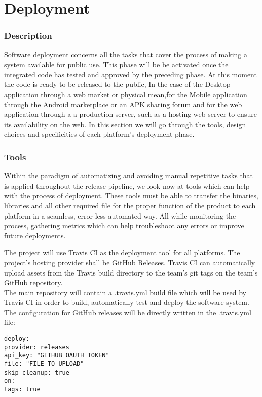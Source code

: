 \documentclass[12pt]{report}
\begin{document}
\part{Deployment}
\section{Description}
Software deployment concerns all the tasks that cover the process of making a system available for public use.
This phase will be be activated once the integrated code has tested and approved by the preceding
phase. At this moment the code is ready to be released to the public, In the case of the Desktop
application through a web market or physical mean,for the Mobile application through the Android
marketplace or an APK sharing forum and for the web application through a a production server, such
as a hosting web server to ensure its availability on the web. In this section we will go through
the tools, design choices and specificities of each platform's deployment phase.

\section{Tools}
Within the paradigm of automatizing and avoiding manual repetitive tasks that is applied throughout the release pipeline, we look now at tools which can help with the process of deployment. These tools must be able to transfer the binaries, libraries and all other required file for the proper function of the product to each platform in a seamless, error-less automated way. All while monitoring the process, gathering metrics which can help troubleshoot any errors or improve future deployments.

The project will use Travis CI as the deployment tool for all platforms. The project's hosting provider shall be GitHub Releases. Travis CI can automatically upload assets from the Travis build directory to the team's git tags on the team's GitHub repository. \\
The main repository will contain a .travis.yml build file which will be used by Travis CI in order to build, automatically test and deploy the software system. The configuration for GitHub releases will be directly written in the .travis.yml file: \\
\begin{lstlisting}
deploy:
provider: releases
api_key: "GITHUB OAUTH TOKEN"
file: "FILE TO UPLOAD"
skip_cleanup: true
on:
tags: true
\end{lstlisting}
\end{document}

